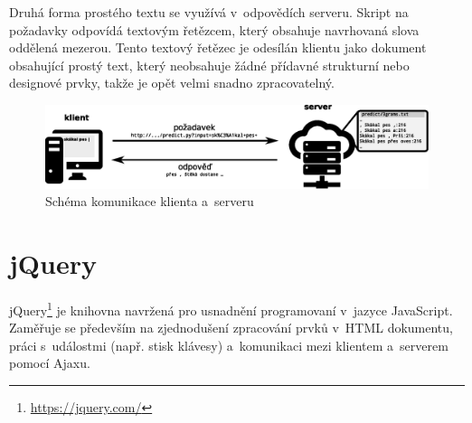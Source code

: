 \documentclass[a4paper,11pt,openany]{book} %
\begin{document}
Druhá forma prostého textu se využívá v~odpovědích serveru. Skript na požadavky odpovídá textovým řetězcem, který obsahuje navrhovaná slova oddělená mezerou. Tento textový řetězec je odesílán klientu jako dokument obsahující prostý text, který neobsahuje žádné přídavné strukturní nebo designové prvky, takže je opět velmi snadno zpracovatelný.

\begin{figure}[h]
	\centering
	\includegraphics[width=1.0\textwidth]{client-server-schema1.eps}
	\caption{Schéma komunikace klienta a~serveru\protect\footnotemark}
	\label{fig:clientserver}
\end{figure}


\section{jQuery}

jQuery\footnote{\url{https://jquery.com/}} je knihovna navržená pro usnadnění programovaní v~jazyce JavaScript. Zaměřuje se především na zjednodušení zpracování prvků v~HTML dokumentu, práci s~událostmi (např. stisk klávesy) a~komunikaci mezi klientem a~serverem pomocí Ajaxu.
\end{document}
